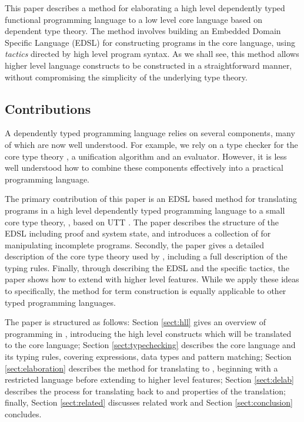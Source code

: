 This paper describes a method for elaborating a high level dependently typed
functional programming language to a low level core language based on dependent
type theory.  The method involves building an Embedded Domain Specific Language
(EDSL) for constructing programs in the core language, using \emph{tactics}
directed by high level program syntax.  
As we shall see, this method allows higher level language constructs to be
constructed in a straightforward manner, without compromising the simplicity
of the underlying type theory.

\subsection{Contributions}

A dependently typed programming language relies on several components, many of
which are now well understood. For example, we rely on a type checker for
the core type theory \cite{Chapman2005epigram,loh2010tutorial}, a
unification algorithm \cite{Miller1992} and an evaluator. However, it is less
well understood how to combine these components effectively into a practical
programming language. 

The primary contribution of this paper is
an EDSL based method for translating programs in a
high level dependently typed programming language to a small core type theory,
\TT{}, based on UTT \cite{luo1994}. The paper describes the structure of the
EDSL including proof and system state, and introduces a collection of 
for manipulating incomplete programs.
Secondly, the paper gives a detailed description of the core type theory used
by \Idris{}, including a full description of the typing rules. Finally, through
describing the EDSL and the specific tactics, the paper shows how to extend
\Idris{} with higher level features.
While we apply these ideas to \Idris{} specifically, the method for term construction
is equally applicable to other typed programming languages.

The paper is structured as follows: Section \ref{sect:hll} gives an overview of
programming in \Idris{}, introducing the high level constructs which will be
translated to the core language; Section \ref{sect:typechecking} describes the
core language \TT{} and its typing rules, covering expressions, data types
and pattern matching; Section \ref{sect:elaboration} describes the method
for translating \Idris{} to \TT{}, beginning with a restricted language
\IdrisM{} before extending to higher level features; Section
\ref{sect:delab} describes the process for translating \TT{} back to \Idris{}
and properties of the translation; finally, 
Section \ref{sect:related} discusses related work and Section \ref{sect:conclusion}
concludes.

